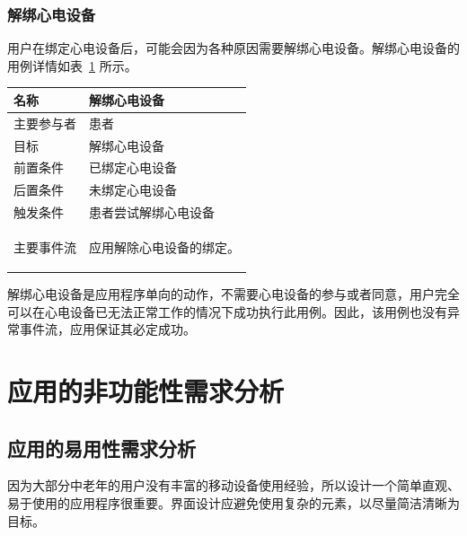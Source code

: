 \subsubsection{解绑心电设备}

用户在绑定心电设备后，可能会因为各种原因需要解绑心电设备。解绑心电设备的用例详情如表~\ref{tab:uc-unbind-device} 所示。

\begin{table}[ht]
    \centering
    \label{tab:uc-unbind-device}
    \begin{tabularx}{\textwidth}{|l|X|}
        \hline
        名称    & 解绑心电设备     \\
        \hline
        主要参与者 & 患者         \\
        \hline
        目标    & 解绑心电设备     \\
        \hline
        前置条件  & 已绑定心电设备    \\
        \hline
        后置条件  & 未绑定心电设备    \\
        \hline
        触发条件  & 患者尝试解绑心电设备 \\
        \hline
        主要事件流 &
        \begin{itemizec}
            \item[1.] 应用解除心电设备的绑定。
        \end{itemizec} \\
        \hline
    \end{tabularx}
\end{table}

解绑心电设备是应用程序单向的动作，不需要心电设备的参与或者同意，用户完全可以在心电设备已无法正常工作的情况下成功执行此用例。因此，该用例也没有异常事件流，应用保证其必定成功。


\section{应用的非功能性需求分析}\label{sec:nonfunc-req}

\subsection{应用的易用性需求分析}\label{subsec:usability}

因为大部分中老年的用户没有丰富的移动设备使用经验，所以设计一个简单直观、易于使用的应用程序很重要。界面设计应避免使用复杂的元素，以尽量简洁清晰为目标。

